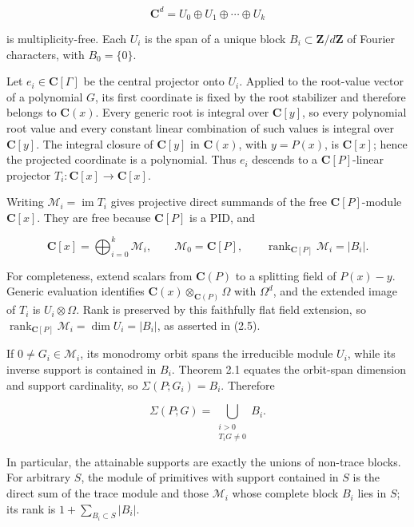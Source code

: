 \documentclass[
  11pt,
  a4paper,
]{amsart}
\begin{document}
\[
\mathbf C^d=U_0\oplus U_1\oplus\cdots\oplus U_k
\]

is multiplicity-free. Each \(U_i\) is the span of a unique block
\(B_i\subset\mathbf Z/d\mathbf Z\) of Fourier characters, with
\(B_0=\{0\}\).

Let \(e_i\in\mathbf C[\Gamma]\) be the central projector onto \(U_i\).
Applied to the root-value vector of a polynomial \(G\), its first
coordinate is fixed by the root stabilizer and therefore belongs to
\(\mathbf C(x)\). Every generic root is integral over \(\mathbf C[y]\),
so every polynomial root value and every constant linear combination of
such values is integral over \(\mathbf C[y]\). The integral closure of
\(\mathbf C[y]\) in \(\mathbf C(x)\), with \(y=P(x)\), is
\(\mathbf C[x]\); hence the projected coordinate is a polynomial. Thus
\(e_i\) descends to a \(\mathbf C[P]\)-linear projector
\(T_i:\mathbf C[x]\to\mathbf C[x]\).

Writing \(\mathcal M_i=\operatorname{im}T_i\) gives projective direct
summands of the free \(\mathbf C[P]\)-module \(\mathbf C[x]\). They are
free because \(\mathbf C[P]\) is a PID, and

\[
\mathbf C[x]=\bigoplus_{i=0}^k\mathcal M_i,\qquad
\mathcal M_0=\mathbf C[P],\qquad
\operatorname{rank}_{\mathbf C[P]}\mathcal M_i=|B_i|.  \tag{2.5}
\]

For completeness, extend scalars from \(\mathbf C(P)\) to a splitting
field of \(P(x)-y\). Generic evaluation identifies
\(\mathbf C(x)\otimes_{\mathbf C(P)}\Omega\) with \(\Omega^d\), and the
extended image of \(T_i\) is \(U_i\otimes\Omega\). Rank is preserved by
this faithfully flat field extension, so
\(\operatorname{rank}_{\mathbf C[P]}\mathcal M_i=\dim U_i=|B_i|\), as
asserted in (2.5).

If \(0\ne G_i\in\mathcal M_i\), its monodromy orbit spans the
irreducible module \(U_i\), while its inverse support is contained in
\(B_i\). Theorem 2.1 equates the orbit-span dimension and support
cardinality, so \(\Sigma(P;G_i)=B_i\). Therefore

\[
\Sigma(P;G)=
\bigcup_{\substack{i>0\\T_iG\ne0}}B_i.                 \tag{2.6}
\]

In particular, the attainable supports are exactly the unions of
non-trace blocks. For arbitrary \(S\), the module of primitives with
support contained in \(S\) is the direct sum of the trace module and
those \(\mathcal M_i\) whose complete block \(B_i\) lies in \(S\); its
rank is \(1+\sum_{B_i\subset S}|B_i|\).
\end{document}
